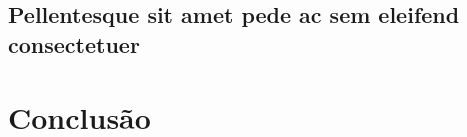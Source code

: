 \section{Pellentesque sit amet pede ac sem eleifend consectetuer}

\lipsum[24]


\chapter*[Conclusão]{Conclusão}

\lipsum[31-33]

\postextual




%

%

\printindex


